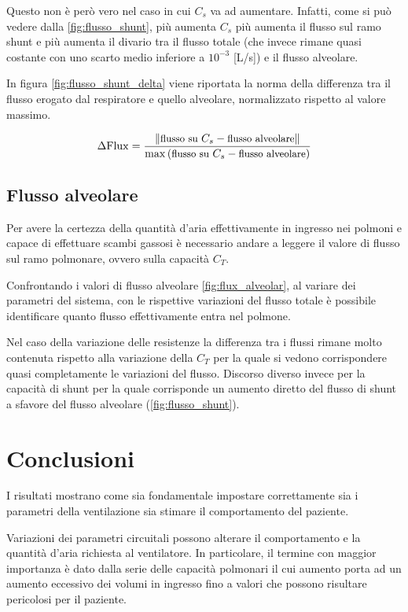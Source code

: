 Questo non è però vero nel caso in cui $C_s$ va ad aumentare. Infatti, come si può vedere dalla \cref{fig:flusso_shunt}, più aumenta $C_s$ più aumenta il flusso sul ramo shunt e più aumenta il divario tra il flusso totale (che invece rimane quasi costante con uno scarto medio inferiore a $10^{-3}$ [L/s]) e il flusso alveolare.

In figura \cref{fig:flusso_shunt_delta} viene riportata la norma della differenza tra il flusso erogato dal respiratore e quello alveolare, normalizzato rispetto al valore massimo. 

\begin{equation}
	\small{
\Delta \mathrm{Flux}={	\|\text{flusso su }C_s - \text{flusso alveolare}\|\over \max\left(\text{flusso su }C_s - \text{flusso alveolare}\right)}}
\label{eq:shunt_Delta}
\end{equation}

\subsection{Flusso alveolare}

Per avere la certezza della quantità d'aria effettivamente in ingresso nei polmoni e capace di effettuare scambi gassosi è necessario andare a leggere il valore di flusso sul ramo polmonare, ovvero sulla capacità $C_T$. 

Confrontando i valori di flusso alveolare \cref{fig:flux_alveolar}, al variare dei parametri del sistema, con le rispettive variazioni del flusso totale è possibile identificare quanto flusso effettivamente entra nel polmone. 

Nel caso della variazione delle resistenze la differenza tra i flussi rimane molto contenuta rispetto alla variazione della $C_T$ per la quale si vedono corrispondere quasi completamente le variazioni del flusso. Discorso diverso invece per la capacità di shunt per la quale corrisponde un aumento diretto del flusso di shunt a sfavore del flusso alveolare (\cref{fig:flusso_shunt}).

\section{Conclusioni}

I risultati mostrano come sia fondamentale impostare correttamente sia i parametri della ventilazione sia stimare il comportamento del paziente. 

Variazioni dei parametri circuitali possono alterare il comportamento e la quantità d'aria richiesta al ventilatore. In particolare, il termine con maggior importanza è dato dalla serie delle capacità polmonari il cui aumento porta ad un aumento eccessivo dei volumi in ingresso fino a valori che possono risultare pericolosi per il paziente.

